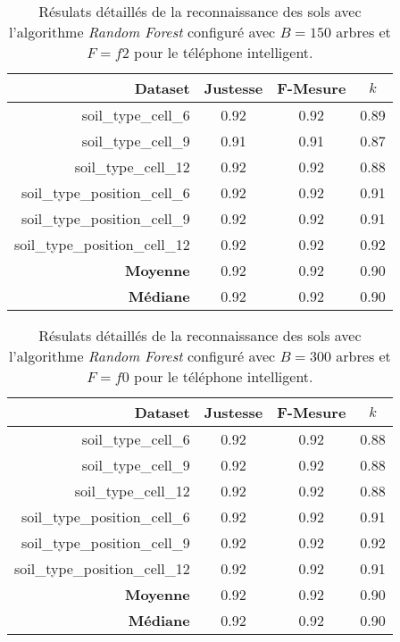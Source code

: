 \begin{table}[H]\renewcommand{\arraystretch}{0.5}
	\centering
	\caption{Résulats détaillés de la reconnaissance des sols avec l'algorithme \textit{Random Forest} configuré avec $B=150$ arbres et $F=f2$ pour le téléphone intelligent.}
	\label{tab:rf-150-f2-cell}
	\begin{tabular}{@{}rccc@{}}
		\toprule
			\textbf{Dataset} & \textbf{Justesse} & \textbf{F-Mesure} & \textbf{$k$} \\
		\midrule
			soil\_type\_cell\_6 & 0.92 & 0.92 & 0.89 \\
			soil\_type\_cell\_9 & 0.91 & 0.91 & 0.87 \\
			soil\_type\_cell\_12 & 0.92 & 0.92 & 0.88 \\
			soil\_type\_position\_cell\_6 & 0.92 & 0.92 & 0.91 \\
			soil\_type\_position\_cell\_9 & 0.92 & 0.92 & 0.91 \\
			soil\_type\_position\_cell\_12 & 0.92 & 0.92 & 0.92 \\
			\textbf{Moyenne} & 0.92 & 0.92 & 0.90 \\
			\textbf{Médiane} & 0.92 & 0.92 & 0.90 \\
		\bottomrule
	\end{tabular}
\end{table}

\begin{table}[H]\renewcommand{\arraystretch}{0.5}
	\centering
	\caption{Résulats détaillés de la reconnaissance des sols avec l'algorithme \textit{Random Forest} configuré avec $B=300$ arbres et $F=f0$ pour le téléphone intelligent.}
	\label{tab:rf-300-f0-cell}
	\begin{tabular}{@{}rccc@{}}
		\toprule
			\textbf{Dataset} & \textbf{Justesse} & \textbf{F-Mesure} & \textbf{$k$} \\
		\midrule
			soil\_type\_cell\_6 & 0.92 & 0.92 & 0.88 \\
			soil\_type\_cell\_9 & 0.92 & 0.92 & 0.88 \\
			soil\_type\_cell\_12 & 0.92 & 0.92 & 0.88 \\
			soil\_type\_position\_cell\_6 & 0.92 & 0.92 & 0.91 \\
			soil\_type\_position\_cell\_9 & 0.92 & 0.92 & 0.92 \\
			soil\_type\_position\_cell\_12 & 0.92 & 0.92 & 0.91 \\
			\textbf{Moyenne} & 0.92 & 0.92 & 0.90 \\
			\textbf{Médiane} & 0.92 & 0.92 & 0.90 \\
		\bottomrule
	\end{tabular}
\end{table}

